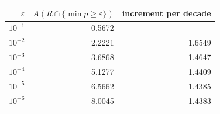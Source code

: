 \begin{tabular}{rrr}
\toprule
$\varepsilon$ & $A(R\cap\{\min p\ge\varepsilon\})$ & increment per decade \\
\midrule
$10^{-1}$ & 0.5672 &  \\
$10^{-2}$ & 2.2221 & 1.6549 \\
$10^{-3}$ & 3.6868 & 1.4647 \\
$10^{-4}$ & 5.1277 & 1.4409 \\
$10^{-5}$ & 6.5662 & 1.4385 \\
$10^{-6}$ & 8.0045 & 1.4383 \\
\bottomrule
\end{tabular}